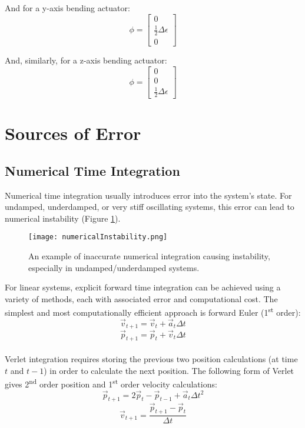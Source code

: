 {And for a y-axis bending actuator:
\[ \phi = \left[ \begin{array}{ccc}
0\\
\tfrac{1}{2}\Delta\epsilon\\
0
 \end{array} \right]
\]

And, similarly, for a z-axis bending actuator:
\[ \phi = \left[ \begin{array}{ccc}
0\\
0\\
\tfrac{1}{2}\Delta\epsilon
 \end{array} \right]
\]

\section{Sources of Error}

\subsection{Numerical Time Integration}

Numerical time integration usually introduces error into the system's state.  For undamped, underdamped, or very stiff oscillating systems, this error can lead to numerical instability (Figure \ref{fig:numericalInstability}).\\

\begin{figure}
  \texttt{[image: numericalInstability.png]}
  \caption{An example of inaccurate numerical integration causing instability, especially in undamped/underdamped systems.}
  \label{fig:numericalInstability}
\end{figure}

For linear systems, explicit forward time integration can be achieved using a variety of methods, each with associated error and computational cost.  The simplest and most computationally efficient approach is forward Euler (1\textsuperscript{st} order):
\[ \vec{v}_{t+1} = \vec{v}_{t} +  \vec{a}_{t}\Delta t\]
\[ \vec{p}_{t+1} = \vec{p}_{t} +  \vec{v}_{t}\Delta t\]\\

Verlet integration requires storing the previous two position calculations (at time $t$ and $t-1$) in order to calculate the next position.  The following form of Verlet gives 2\textsuperscript{nd} order position and 1\textsuperscript{st} order velocity calculations:
\[ \vec{p}_{t+1} = 2\vec{p}_{t} - \vec{p}_{t-1} +  \vec{a}_{t}\Delta t^2\]
\[ \vec{v}_{t+1} = \dfrac{\vec{p}_{t+1} - \vec{p}_{t}}{\Delta t}\]\\

}
